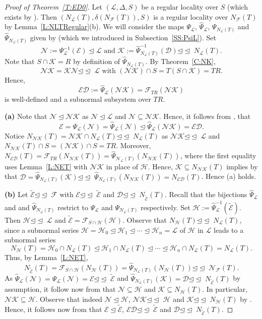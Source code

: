 \documentclass[reqno,11pt]{amsart}
\numberwithin{equation}{section}
\theoremstyle{definition}
\newcommand{\F}{\mathcal{F}}
\newcommand{\E}{\mathcal{E}}
\renewcommand{\L}{\mathcal{L}}
\newcommand{\N}{\mathcal{N}}
\newcommand{\K}{\mathcal{K}}
\renewcommand{\H}{\mathcal{H}}
\newcommand{\mD}{\mathcal{D}}
\newcommand{\tE}{\widetilde{\E}}
\newcommand{\subn}{{\unlhd\!\unlhd\;}}
\begin{document}
\begin{proof}[Proof of Theorem~\ref{T:ED0}]
Let $(\L,\Delta,S)$ be a regular locality over $S$ (which exists by \cite[Lemma~10.4]{Henke:Regular}). Then $(N_\L(T),\delta(N_\F(T)),S)$ is a regular locality over $N_\F(T)$ by Lemma~\ref{L:NLTRegular}(b). We will consider the maps $\Psi_\L$, $\hat{\Psi}_\L$, $\Psi_{N_\L(T)}$ and $\hat{\Psi}_{N_\L(T)}$ given by \cite[Theorem~A, Theorem~F]{Chermak/Henke} (which we introduced in Subsection~\ref{SS:PsiL}). Set
\[\N:=\Psi_\L^{-1}(\E)\unlhd\L\mbox{ and }\K:=\hat{\Psi}_{N_\L(T)}^{-1}(\mD)\subn N_\L(T).\]
Note that $S\cap\K=R$ by definition of $\hat{\Psi}_{N_\L(T)}$. By Theorem~\ref{C:NK},
\[\N\K=\K\N\subn\L \mbox{ with }(\N\K)\cap S=T(S\cap\K)=TR.\]
Hence, 
\[\E\mD:=\hat{\Psi}_\L(\N\K)=\F_{TR}(\N\K)\]
is well-defined and a subnormal subsystem over $TR$.

\smallskip

\textbf{(a)} Note that $\N\unlhd\N\K$ as $\N\unlhd\L$ and $\N\subseteq\N\K$. Hence, it follows from \cite[Proposition~7.1(c)]{Chermak/Henke}, that
\[\E=\Psi_\L(\N)=\hat{\Psi}_\L(\N)\unlhd\hat{\Psi}_\L(\N\K)=\E\mD.\]
Notice $N_{\N\K}(T)=\N\K\cap N_\L(T)\subn N_\L(T)$ as $\N\K\subn\L$ and $N_{\N\K}(T)\cap S=(\N\K)\cap S=TR$. Moreover, $N_{\E\mD}(T)=\F_{TR}(N_{\N\K}(T))=\hat{\Psi}_{\N_\L(T)}(N_{\N\K}(T))$, where the first equality uses Lemma~\ref{L:NET} with $\N\K$ in place of $\H$. Hence, $\K\subseteq N_{\N\K}(T)$ implies by \cite[Proposition~7.1(c)]{Chermak/Henke} that $\mD=\hat{\Psi}_{N_\L(T)}(\K)\subn \hat{\Psi}_{N_\L(T)}(N_{\N\K}(T))=N_{\E\mD}(T)$. Hence (a) holds.

\smallskip

\textbf{(b)} Let $\tE\subn\F$ with $\E\subn\tE$ and $\mD\subn N_{\tE}(T)$. Recall that the bijections $\hat{\Psi}_\L$ and
and $\hat{\Psi}_{N_\L(T)}$ restrict to $\Psi_\L$ and $\Psi_{N_\L(T)}$ respectively. Set $\H:=\hat{\Psi}_\L^{-1}(\tE)$. Then $\H\subn\L$ and $\tE=\F_{S\cap\H}(\H)$. Observe that $N_\H(T)\subn N_\L(T)$, since a subnormal series $\H=\H_0\unlhd\H_1\unlhd\cdots\unlhd \H_n=\L$ of $\H$ in $\L$ leads to a subnormal series
\[N_\H(T)=\H_0\cap N_\L(T)\unlhd \H_1\cap N_\L(T)\unlhd\cdots\unlhd \H_n\cap N_\L(T)=N_\L(T).\]
Thus, by Lemma~\ref{L:NET},
\[N_{\tE}(T)=\F_{S\cap\H}(N_\H(T))=\hat{\Psi}_{N_\L(T)}(N_\H(T))\subn\N_\F(T).\]
As $\hat{\Psi}_\L(\N)=\Psi_\L(\N)=\E\subn\tE$ and $\hat{\Psi}_{N_\L(T)}(\K)=\mD\subn N_{\tE}(T)$ by assumption, it follow now from \cite[Proposition~7.1(b)]{Chermak/Henke} that $\N\subseteq \H$ and $\K\subseteq N_\H(T)$. In particular, $\N\K\subseteq\H$. Observe that indeed $\N\unlhd\H$, $\N\K\subn\H$ and $\K\subn N_\H(T)$ by \cite[Lemma~3.7(a)]{Henke:Regular}. Hence, it follows now from \cite[Proposition~7.1(c)]{Chermak/Henke} that $\E\unlhd\tE$, $\E\mD\subn\tE$ and $\mD\subn N_{\tE}(T)$.


\end{proof}
\end{document}
